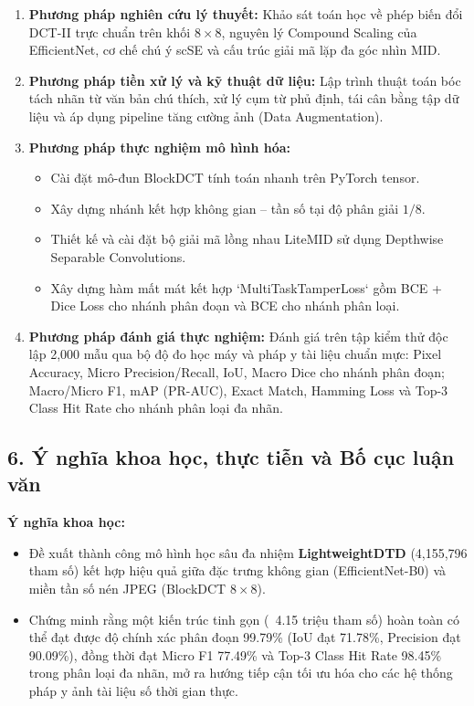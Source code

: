 \begin{enumerate}[label=\alph*)]
    \item \textbf{Phương pháp nghiên cứu lý thuyết:} Khảo sát toán học về phép biến đổi DCT-II trực chuẩn trên khối $8 \times 8$, nguyên lý Compound Scaling của EfficientNet, cơ chế chú ý scSE và cấu trúc giải mã lặp đa góc nhìn MID.
    \item \textbf{Phương pháp tiền xử lý và kỹ thuật dữ liệu:} Lập trình thuật toán bóc tách nhãn từ văn bản chú thích, xử lý cụm từ phủ định, tái cân bằng tập dữ liệu và áp dụng pipeline tăng cường ảnh (Data Augmentation).
    \item \textbf{Phương pháp thực nghiệm mô hình hóa:}
    \begin{itemize}
        \item Cài đặt mô-đun BlockDCT tính toán nhanh trên PyTorch tensor.
        \item Xây dựng nhánh kết hợp không gian -- tần số tại độ phân giải $1/8$.
        \item Thiết kế và cài đặt bộ giải mã lồng nhau LiteMID sử dụng Depthwise Separable Convolutions.
        \item Xây dựng hàm mất mát kết hợp `MultiTaskTamperLoss` gồm BCE + Dice Loss cho nhánh phân đoạn và BCE cho nhánh phân loại.
    \end{itemize}
    \item \textbf{Phương pháp đánh giá thực nghiệm:} Đánh giá trên tập kiểm thử độc lập 2,000 mẫu qua bộ độ đo học máy và pháp y tài liệu chuẩn mực: Pixel Accuracy, Micro Precision/Recall, IoU, Macro Dice cho nhánh phân đoạn; Macro/Micro F1, mAP (PR-AUC), Exact Match, Hamming Loss và Top-3 Class Hit Rate cho nhánh phân loại đa nhãn.
\end{enumerate}

\subsection{6. Ý nghĩa khoa học, thực tiễn và Bố cục luận văn}

\indent\indent \textbf{Ý nghĩa khoa học:}
\begin{itemize}
    \item Đề xuất thành công mô hình học sâu đa nhiệm \textbf{LightweightDTD} (4,155,796 tham số) kết hợp hiệu quả giữa đặc trưng không gian (EfficientNet-B0) và miền tần số nén JPEG (BlockDCT $8 \times 8$).
    \item Chứng minh rằng một kiến trúc tinh gọn (~4.15 triệu tham số) hoàn toàn có thể đạt được độ chính xác phân đoạn 99.79\% (IoU đạt 71.78\%, Precision đạt 90.09\%), đồng thời đạt Micro F1 77.49\% và Top-3 Class Hit Rate 98.45\% trong phân loại đa nhãn, mở ra hướng tiếp cận tối ưu hóa cho các hệ thống pháp y ảnh tài liệu số thời gian thực.
\end{itemize}
\vspace{0.3cm}

